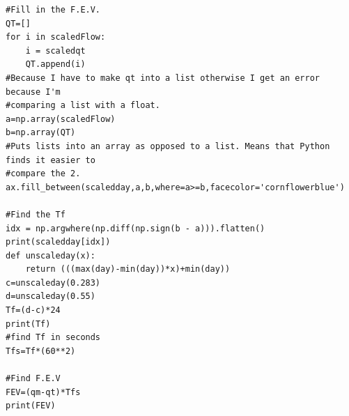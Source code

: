 \documentclass[11 pt, a4paper]{article}
\begin{document}
\begin{lstlisting}
#Fill in the F.E.V.
QT=[]
for i in scaledFlow:
    i = scaledqt
    QT.append(i)
#Because I have to make qt into a list otherwise I get an error because I'm
#comparing a list with a float.
a=np.array(scaledFlow)
b=np.array(QT)
#Puts lists into an array as opposed to a list. Means that Python finds it easier to
#compare the 2.
ax.fill_between(scaledday,a,b,where=a>=b,facecolor='cornflowerblue')

#Find the Tf
idx = np.argwhere(np.diff(np.sign(b - a))).flatten()
print(scaledday[idx])
def unscaleday(x):
    return (((max(day)-min(day))*x)+min(day))
c=unscaleday(0.283)
d=unscaleday(0.55)
Tf=(d-c)*24
print(Tf)
#find Tf in seconds
Tfs=Tf*(60**2)

#Find F.E.V
FEV=(qm-qt)*Tfs
print(FEV)
\end{lstlisting}
\end{document}
